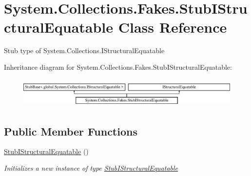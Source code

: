 \hypertarget{class_system_1_1_collections_1_1_fakes_1_1_stub_i_structural_equatable}{\section{System.\-Collections.\-Fakes.\-Stub\-I\-Structural\-Equatable Class Reference}
\label{class_system_1_1_collections_1_1_fakes_1_1_stub_i_structural_equatable}
}


Stub type of System.\-Collections.\-I\-Structural\-Equatable 


Inheritance diagram for System.\-Collections.\-Fakes.\-Stub\-I\-Structural\-Equatable\-:\begin{figure}[H]
\begin{center}
\leavevmode
\includegraphics[height=1.564246cm]{class_system_1_1_collections_1_1_fakes_1_1_stub_i_structural_equatable}
\end{center}
\end{figure}
\subsection*{Public Member Functions}
\begin{DoxyCompactItemize}
\item 
\hyperlink{class_system_1_1_collections_1_1_fakes_1_1_stub_i_structural_equatable_a285a9973f8c8da85370b5cf8e9c3cc97}{Stub\-I\-Structural\-Equatable} ()
\begin{DoxyCompactList}\small\item\em Initializes a new instance of type \hyperlink{class_system_1_1_collections_1_1_fakes_1_1_stub_i_structural_equatable}{Stub\-I\-Structural\-Equatable}\end{DoxyCompactList}\end{DoxyCompactItemize}
